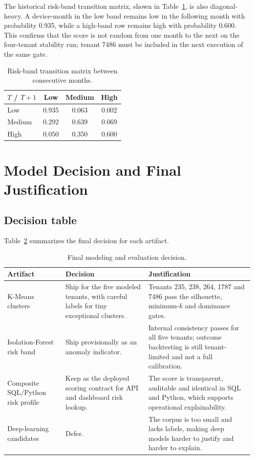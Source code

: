 The historical risk-band transition matrix, shown in Table~\ref{tab:band-transition}, is also diagonal-heavy. A device-month in the low band remains low in the following month with probability 0.935, while a high-band row remains high with probability 0.600. This confirms that the score is not random from one month to the next on the four-tenant stability run; tenant 7486 must be included in the next execution of the same gate.

\begin{table}[h]
\centering
\caption{Risk-band transition matrix between consecutive months.}
\label{tab:band-transition}
\small
\begin{tabular}{|l|c|c|c|}
\hline
\textbf{$T$ / $T+1$} & \textbf{Low} & \textbf{Medium} & \textbf{High} \\
\hline
Low    & 0.935 & 0.063 & 0.002 \\
Medium & 0.292 & 0.639 & 0.069 \\
High   & 0.050 & 0.350 & 0.600 \\
\hline
\end{tabular}
\end{table}

\section{Model Decision and Final Justification}

\subsection{Decision table}
Table~\ref{tab:model-decision} summarizes the final decision for each artifact.

\begin{table}[h]
\centering
\caption{Final modeling and evaluation decision.}
\label{tab:model-decision}
\small
\begin{tabularx}{\textwidth}{|p{3.1cm}|X|X|}
\hline
\textbf{Artifact} & \textbf{Decision} & \textbf{Justification} \\
\hline
K-Means clusters & Ship for the five modeled tenants, with careful labels for tiny exceptional clusters. & Tenants 235, 238, 264, 1787 and 7486 pass the silhouette, minimum-$k$ and dominance gates. \\
\hline
Isolation-Forest risk band & Ship provisionally as an anomaly indicator. & Internal consistency passes for all five tenants; outcome backtesting is still tenant-limited and not a full calibration. \\
\hline
Composite SQL/Python risk profile & Keep as the deployed scoring contract for API and dashboard risk lookup. & The score is transparent, auditable and identical in SQL and Python, which supports operational explainability. \\
\hline
Deep-learning candidates & Defer. & The corpus is too small and lacks labels, making deep models harder to justify and harder to explain. \\
\hline
\end{tabularx}
\end{table}


